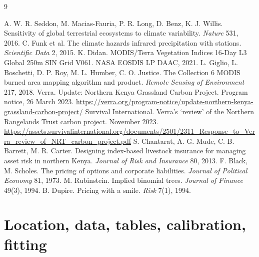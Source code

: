 \documentclass{article}
\begin{document}
\begin{thebibliography}{9}\raggedright
{} A. W. R. Seddon, M. Macias-Fauria, P. R. Long, D. Benz, K. J. Willis. Sensitivity of global terrestrial ecosystems to climate variability. \emph{Nature} 531, 2016.
 C. Funk et al. The climate hazards infrared precipitation with stations. \emph{Scientific Data} 2, 2015.
 K. Didan. MODIS/Terra Vegetation Indices 16-Day L3 Global 250m SIN Grid V061. NASA EOSDIS LP DAAC, 2021.
 L. Giglio, L. Boschetti, D. P. Roy, M. L. Humber, C. O. Justice. The Collection 6 MODIS burned area mapping algorithm and product. \emph{Remote Sensing of Environment} 217, 2018.
 Verra. Update: Northern Kenya Grassland Carbon Project. Program notice, 26 March 2023. \url{https://verra.org/program-notice/update-northern-kenya-grassland-carbon-project/}
 Survival International. Verra's `review' of the Northern Rangelands Trust carbon project. November 2023. \url{https://assets.survivalinternational.org/documents/2501/2311_Response_to_Verra_review_of_NRT_carbon_project.pdf}
 S. Chantarat, A. G. Mude, C. B. Barrett, M. R. Carter. Designing index-based livestock insurance for managing asset risk in northern Kenya. \emph{Journal of Risk and Insurance} 80, 2013.
 F. Black, M. Scholes. The pricing of options and corporate liabilities. \emph{Journal of Political Economy} 81, 1973.
 M. Rubinstein. Implied binomial trees. \emph{Journal of Finance} 49(3), 1994.
 B. Dupire. Pricing with a smile. \emph{Risk} 7(1), 1994.
\end{thebibliography}

\appendix
\section{Location, data, tables, calibration, fitting}
\end{document}
